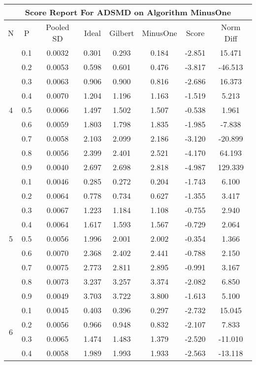 \documentclass[11pt,a4paper]{report}
\begin{document}
\begin{longtable}{ | c | c || c | c | c | c | c | c | }
\hline
\multicolumn{8}{|c|}{ Score Report For ADSMD on Algorithm MinusOne} \\
\hline
N & P & Pooled SD &  Ideal &  Gilbert & MinusOne  & Score & Norm Diff \\
 \hline
 \hline
 \endhead
\multirow{9}{*}{4} & 0.1 & 0.0032 & 0.301 & 0.293 & 0.184 & -2.851 & 15.471 \\
 & 0.2 & 0.0053 & 0.598 & 0.601 & 0.476 & -3.817 & -46.513 \\
 & 0.3 & 0.0063 & 0.906 & 0.900 & 0.816 & -2.686 & 16.373 \\
 & 0.4 & 0.0070 & 1.204 & 1.196 & 1.163 & -1.519 & 5.213 \\
 & 0.5 & 0.0066 & 1.497 & 1.502 & 1.507 & -0.538 & 1.961 \\
 & 0.6 & 0.0059 & 1.803 & 1.798 & 1.835 & -1.985 & -7.838 \\
 & 0.7 & 0.0058 & 2.103 & 2.099 & 2.186 & -3.120 & -20.899 \\
 & 0.8 & 0.0056 & 2.399 & 2.401 & 2.521 & -4.170 & 64.193 \\
 & 0.9 & 0.0040 & 2.697 & 2.698 & 2.818 & -4.987 & 129.339 \\
 \hline
\multirow{9}{*}{5} & 0.1 & 0.0046 & 0.285 & 0.272 & 0.204 & -1.743 & 6.100 \\
 & 0.2 & 0.0064 & 0.778 & 0.734 & 0.627 & -1.355 & 3.417 \\
 & 0.3 & 0.0067 & 1.223 & 1.184 & 1.108 & -0.755 & 2.940 \\
 & 0.4 & 0.0064 & 1.617 & 1.593 & 1.567 & -0.729 & 2.064 \\
 & 0.5 & 0.0056 & 1.996 & 2.001 & 2.002 & -0.354 & 1.366 \\
 & 0.6 & 0.0070 & 2.368 & 2.402 & 2.441 & -0.788 & 2.150 \\
 & 0.7 & 0.0075 & 2.773 & 2.811 & 2.895 & -0.991 & 3.167 \\
 & 0.8 & 0.0073 & 3.237 & 3.257 & 3.374 & -2.082 & 6.850 \\
 & 0.9 & 0.0049 & 3.703 & 3.722 & 3.800 & -1.613 & 5.100 \\
 \hline
\multirow{9}{*}{6} & 0.1 & 0.0045 & 0.403 & 0.396 & 0.297 & -2.732 & 15.045 \\
 & 0.2 & 0.0056 & 0.966 & 0.948 & 0.832 & -2.107 & 7.833 \\
 & 0.3 & 0.0065 & 1.474 & 1.483 & 1.379 & -2.520 & -11.010 \\
 & 0.4 & 0.0058 & 1.989 & 1.993 & 1.933 & -2.563 & -13.118 \\

\end{longtable}
\end{document}
